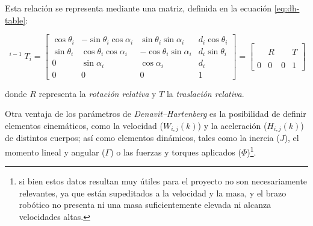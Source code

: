 Esta relación se representa mediante una matriz, definida en la ecuación \ref{eq:dh-table}:

\begin{equation}
    {
    \displaystyle \operatorname {}
    ^{i-1}T_{i}=\left[{
                \begin{array}{ccc|c}
                    \cos{\theta_{i}} & -\sin{\theta_{i}}\cos{\alpha_{i}} & \sin{\theta_{i}}\sin{\alpha_{i}}  & d_{i}\cos{\theta_{i}} \\
                    \sin{\theta_{i}} & \cos{\theta_{i}}\cos{\alpha_{i}}  & -\cos{\theta_{i}}\sin{\alpha_{i}} & d_{i}\sin{\theta_{i}} \\
                    0                & \sin{\alpha_{i}}                  & \cos{\alpha_{i}}                  & d_{i}                 \\
                    \hline
                    0                & 0                                 & 0                                 & 1
                \end{array}}\right] =
    \left[{
                \begin{array}{ccc|c}
                      &   &   &   \\
                      & R &   & T \\
                      &   &   &   \\
                    \hline
                    0 & 0 & 0 & 1
                \end{array}}
        \right]
    }
\end{equation}
\label{eq:dh-table}

donde $R$ representa la \textit{rotación relativa} y $T$ la \textit{traslación relativa}.

Otra ventaja de los parámetros de \textit{Denavit--Hartenberg} es la posibilidad de
definir elementos cinemáticos, como la velocidad ($W_{i,j}(k)$) y la aceleración ($H_{i,j}(k)$)
de distintos cuerpos; así como elementos dinámicos, tales como la inercia ($J$),
el momento lineal y angular ($\Gamma$) o las fuerzas y torques aplicados 
($\Phi$)\footnote{si bien estos datos resultan muy útiles para el proyecto no son necesariamente
relevantes, ya que están supeditados a la velocidad y la masa, y el brazo robótico
no presenta ni una masa suficientemente elevada ni alcanza velocidades altas.}.